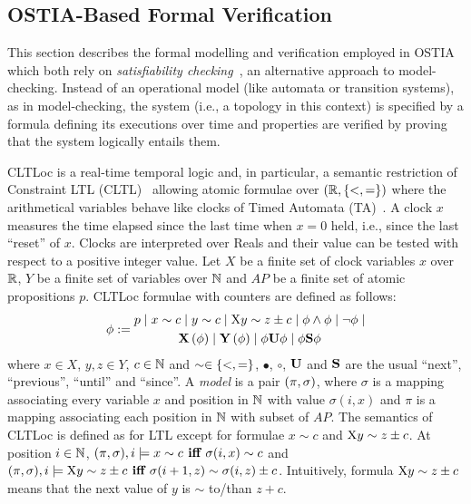 \subsection{OSTIA-Based Formal Verification}\label{ver}


This section describes the formal modelling and verification employed in OSTIA  which both rely on \textit{satisfiability checking}~\cite{MPS13}, an alternative approach to model-checking.
Instead of an operational model (like automata or transition systems), as in model-checking, 
the system (i.e., a topology in this context) is specified by a formula defining its executions over time and properties are verified by proving that the system logically entails them.

CLTLoc is a real-time temporal logic and, in particular, a semantic restriction of Constraint LTL (CLTL)~\cite{DD07} allowing atomic formulae over $(\mathbb{R}, \{ <,= \})$ where the arithmetical variables behave like clocks of Timed Automata (TA)~\cite{timed}.
A clock $x$ measures the time elapsed since the last time when $x=0$ held, i.e., since the last ``reset'' of $x$.
Clocks are interpreted over Reals and their value can be tested with respect to a positive integer value.
%
Let $X$ be a finite set of clock variables $x$ over $\mathbb{R}$, $Y$ be a finite set of variables over $\mathbb{N}$ and $AP$ be a finite set of atomic propositions $p$.
CLTLoc formulae with counters are defined as follows:
\begin{equation*}%
  \phi :=
  \begin{gathered}
    p \mid x\sim c \mid y\sim c\mid \aX y\sim z\pm c \mid\phi \wedge \phi \mid \neg \phi \mid \\
       \X{\phi} \mid \Y{\phi} %
\mid \phi\U\phi \mid \phi\Snc\phi
  \end{gathered}
\end{equation*}
where $x \in X$, $y,z \in Y$, $c \in \mathbb{N}$ and 
$\sim \in \{ <,= \}$, $\bullet$, $\circ$, $\mathbf{U}$ and $\mathbf{S}$ are the
usual ``next'', ``previous'', ``until'' and ``since''.
A \textit{model} is a pair $(\pi, \sigma)$, where $\sigma$ is a mapping associating every variable $x$ and position in $\mathbb{N}$ with value $\sigma(i,x)$ and $\pi$ is a mapping associating each position in $\mathbb{N}$ with subset of $AP$. 
The semantics of CLTLoc is defined as for LTL except for formulae $x\sim c$ and $\mathrm{X} y \sim z\pm c$. 
At position $i\in\mathbb{N}$,
$ (\pi, \sigma), i \models x\sim c \textbf{ iff }  \sigma(i, x)\sim c$
and $(\pi, \sigma), i \models \mathrm{X} y\sim z \pm c \textbf{ iff }  \sigma(i+1, z) \sim \sigma(i,z) \pm c$.
Intuitively, formula $\mathrm{X} y \sim z\pm c$ means that the next value of $y$ is $\sim$ to/than $z+c$.

